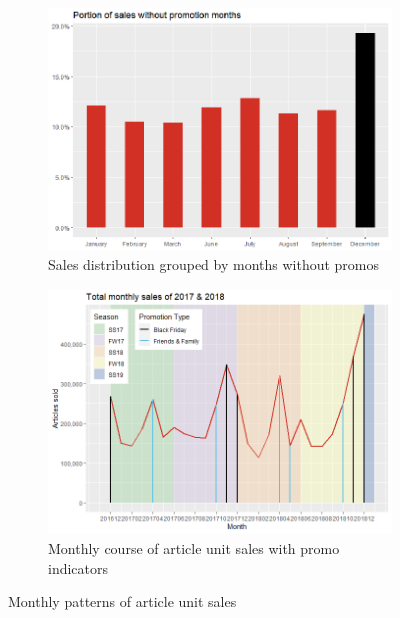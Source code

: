  \begin{figure}[H]
\centering
\begin{subfigure}{.45\textwidth}
  \centering
  \includegraphics[width=\linewidth]{figures/sales_without_promo_months.eps}
  \caption{Sales distribution grouped by months without promos}
  \label{fig:sales_without_promo_months}
\end{subfigure}
\begin{subfigure}{.45\textwidth}
  \centering
  \includegraphics[width=\linewidth]{figures/monthly_ts.png}
  \caption{Monthly course of article unit sales with promo indicators}
  \label{fig:monthly_ts}
\end{subfigure}
\caption{Monthly patterns of article unit sales}
\label{fig:monthly_sales}
\end{figure}



